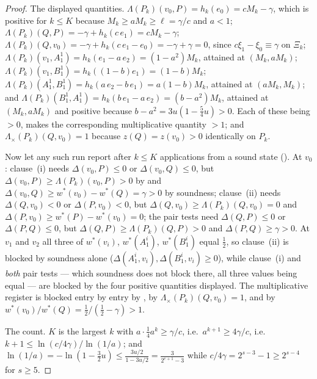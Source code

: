 \documentclass[11pt]{article}
\theoremstyle{plain}
\theoremstyle{definition}
\begin{document}
\begin{proof}
The displayed quantities. $\Lambda(P_k)(v_0,P)=h_k(e_0)=cM_k-\gamma$,
which is positive for $k\le K$ because $M_k\ge aM_k\ge\ell=\gamma/c$ and
$a<1$; $\Lambda(P_k)(Q,P)=-\gamma+h_k(c\,e_1)=cM_k-\gamma$;
$\Lambda(P_k)(Q,v_0)=-\gamma+h_k(c\,e_1-e_0)=-\gamma+\gamma=0$, since
$c\xi_1-\xi_0\equiv\gamma$ on $\Xi_k$;
$\Lambda(P_k)(v_1,A^{1}_1)=h_k(e_1-a\,e_2)=(1-a^{2})M_k$, attained at
$(M_k,aM_k)$; $\Lambda(P_k)(v_1,B^{1}_1)=h_k((1-b)e_1)=(1-b)M_k$;
$\Lambda(P_k)(A^{1}_1,B^{1}_1)=h_k(a\,e_2-b\,e_1)=a(1-b)M_k$, attained at
$(aM_k,M_k)$; and $\Lambda(P_k)(B^{1}_1,A^{1}_1)=h_k(b\,e_1-a\,e_2)
=(b-a^{2})M_k$, attained at $(M_k,aM_k)$ and positive because
$b-a^{2}=3u(1-\tfrac54u)>0$. Each of these being $>0$, 
makes the corresponding multiplicative quantity $>1$; and
$\Lambda_\times(P_k)(Q,v_0)=1$ because $z(Q)=z(v_0)>0$ identically on
$P_k$.

Now let any such run report after $k\le K$ applications from a sound
state (). At $v_0$: clause~(i) needs $\Delta(v_0,P)\le0$ or
$\Delta(v_0,Q)\le0$, but $\Delta(v_0,P)\ge\Lambda(P_k)(v_0,P)>0$ by
 and $\Delta(v_0,Q)\ge w^\ast(v_0)-w^\ast(Q)=\gamma>0$
by soundness; clause~(ii) needs $\Delta(Q,v_0)<0$ or $\Delta(P,v_0)<0$,
but $\Delta(Q,v_0)\ge\Lambda(P_k)(Q,v_0)=0$ and
$\Delta(P,v_0)\ge w^\ast(P)-w^\ast(v_0)=0$; the pair tests need
$\Delta(Q,P)\le0$ or $\Delta(P,Q)\le0$, but
$\Delta(Q,P)\ge\Lambda(P_k)(Q,P)>0$ and $\Delta(P,Q)\ge\gamma>0$. At
$v_1$ and $v_2$ all three of $w^\ast(v_i)$, $w^\ast(A^{i}_1)$,
$w^\ast(B^{i}_1)$ equal $\tfrac12$, so clause~(ii) is blocked by soundness
alone ($\Delta(A^{i}_1,v_i),\Delta(B^{i}_1,v_i)\ge0$), while clause~(i)
and \emph{both} pair tests --- which soundness does not block there, all
three values being equal --- are blocked by the four positive quantities
displayed. The multiplicative register is blocked entry by entry by
, by $\Lambda_\times(P_k)(Q,v_0)=1$, and by
$w^\ast(v_0)/w^\ast(Q)=\tfrac12/(\tfrac12-\gamma)>1$.

The count. $K$ is the largest $k$ with $a\cdot\tfrac14a^{k}\ge\gamma/c$,
i.e.\ $a^{k+1}\ge4\gamma/c$, i.e.\ $k+1\le\ln(c/4\gamma)/\ln(1/a)$; and
$\ln(1/a)=-\ln(1-\tfrac32u)\le\tfrac{3u/2}{1-3u/2}=\tfrac{3}{2^{e+1}-3}$
while $c/4\gamma=2^{s-3}-1\ge2^{s-4}$ for $s\ge5$.
\end{proof}
\end{document}
